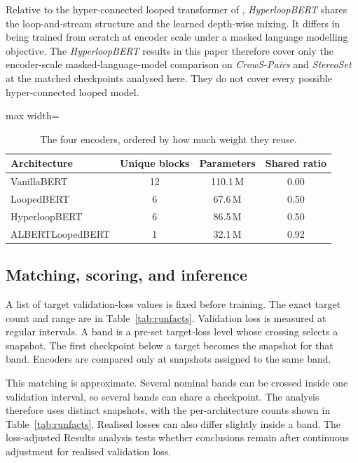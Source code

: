 \documentclass[sigconf,natbib=true,anonymous=true]{acmart}
\begin{document}
Relative to the hyper-connected looped transformer of
\citet{zeitoun2026hyperloop}, \emph{HyperloopBERT} shares the loop-and-stream
structure and the learned depth-wise mixing. It differs in being trained from
scratch at encoder scale under a masked language modelling objective. The
\emph{HyperloopBERT} results in this paper therefore cover only the
encoder-scale masked-language-model comparison on \emph{CrowS-Pairs} and
\emph{StereoSet} at the matched checkpoints analysed here. They do not cover
every possible hyper-connected looped model.

\begin{table}[t]
\centering
\caption{The four encoders, ordered by how much weight they reuse.}
\label{tab:arch}
\small
\begin{adjustbox}{max width=\columnwidth}
\begin{tabular}{lccc}
\toprule
Architecture & Unique blocks & Parameters & Shared ratio \\
\midrule
VanillaBERT       & 12 & 110.1\,M & 0.00 \\
LoopedBERT        &  6 &  67.6\,M & 0.50 \\
HyperloopBERT     &  6 &  86.5\,M & 0.50 \\
ALBERTLoopedBERT  &  1 &  32.1\,M & 0.92 \\
\bottomrule
\end{tabular}
\end{adjustbox}
\end{table}

\subsection{Matching, scoring, and inference}
\label{sec:rules}

A list of target validation-loss values is fixed before training. The exact
target count and range are in Table~\ref{tab:runfacts}. Validation loss is
measured at regular intervals. A band is a pre-set target-loss level whose
crossing selects a snapshot. The first checkpoint below a target becomes the
snapshot for that band. Encoders are compared only at snapshots assigned to the
same band.

This matching is approximate. Several nominal bands can be crossed inside one
validation interval, so several bands can share a checkpoint. The analysis
therefore uses distinct snapshots, with the per-architecture counts shown in
Table~\ref{tab:runfacts}. Realised losses can also differ slightly inside a
band. The loss-adjusted Results analysis tests whether conclusions remain after
continuous adjustment for realised validation loss.
\end{document}
